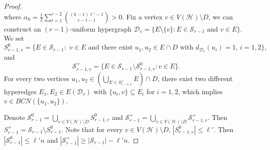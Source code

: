 \documentclass[10pt,a4paper]{amsart}
\newcommand{\mh}{\mathcal{H}}
\begin{document}
\begin{proof}
\begin{equation}
     \end{equation}
      where $
     \alpha_0=\frac{1}{2}\sum_{t=1}^{r-2}\binom{(k-1)\ell'-1}{r-t-1}>0$.
          Fix a vertex $v\in V(\mh)\setminus D$, we can construct an $(r-1)$-uniform hypergraph $\mathcal{D}_v=\{E\setminus \{v\}: E\in \mathcal{S}_{r-1} \text{~and $v\in E$}\}$. %
    We set $$S_{r-1,v}^0=\{E\in \mathcal{S}_{r-1}: \text{~$v\in E$ and there exist $u_1,u_2\in E\cap D$ with $d_{\mathcal{D}_v}(u_i)=1$, $i=1,2$}\},$$
    and $$\mathcal{S}^+_{r-1,v}=\{E\in \mathcal{S}_{r-1}\setminus\mathcal{S}_{r-1,v}^0:\text{$v\in E$}\}.$$
    For every two vertices $u_1,u_2\in \left(\bigcup_{E\in S^+_{r-1,v}}E\right)\cap D$, there exist two different hyperedges $E_1,E_2\in E(\mathcal{D}_{v})$ with $\{u_i,v\}\subseteq E_i$ for $i=1,2$, which implies $v\in BCN(\{u_1,u_2\})$.

   Denote $\mathcal{S}_{r-1}^0=\bigcup_{v\in V(\mh)\setminus D} S_{r-1,v}^0$ and $\mathcal{S}^+_{r-1}=\bigcup_{v\in V(\mh)\setminus D}\mathcal{S}_{r-1,v}^+$. Then $S^+_{r-1}=\mathcal{S}_{r-1}\setminus S_{r-1}^0$. Note that for every $v\in V(\mh)\setminus D$,  $|S_{r-1,v}^0|\leq \ell'$. Then $|\mathcal{S}_{r-1}^0|\leq \ell' n$ and $|\mathcal{S}_{r-1}^+|\geq |\mathcal{S}_{r-1}|-\ell' n$.


\end{proof}
\end{document}
